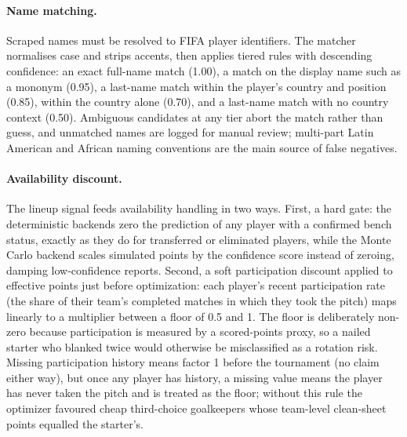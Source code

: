 \paragraph{Name matching.}
Scraped names must be resolved to FIFA player identifiers. The
matcher normalises case and strips accents, then applies tiered
rules with descending confidence: an exact full-name match (1.00), a
match on the display name such as a mononym (0.95), a last-name
match within the player's country and position (0.85), within the
country alone (0.70), and a last-name match with no country context
(0.50). Ambiguous candidates at any tier abort the match rather than
guess, and unmatched names are logged for manual review; multi-part
Latin American and African naming conventions are the main source of
false negatives.

\paragraph{Availability discount.}
The lineup signal feeds availability handling in two ways. First, a
hard gate: the deterministic backends zero the prediction of any
player with a confirmed bench status, exactly as they do for
transferred or eliminated players, while the Monte Carlo backend
scales simulated points by the confidence score instead of zeroing,
damping low-confidence reports. Second, a soft participation
discount applied to effective points just before optimization: each
player's recent participation rate (the share of their team's
completed matches in which they took the pitch) maps linearly to a
multiplier between a floor of 0.5 and 1. The floor is deliberately
non-zero because participation is measured by a scored-points proxy,
so a nailed starter who blanked twice would otherwise be
misclassified as a rotation risk. Missing participation history
means factor 1 before the tournament (no claim either way), but once
any player has history, a missing value means the player has never
taken the pitch and is treated as the floor; without this rule the
optimizer favoured cheap third-choice goalkeepers whose team-level
clean-sheet points equalled the starter's.

